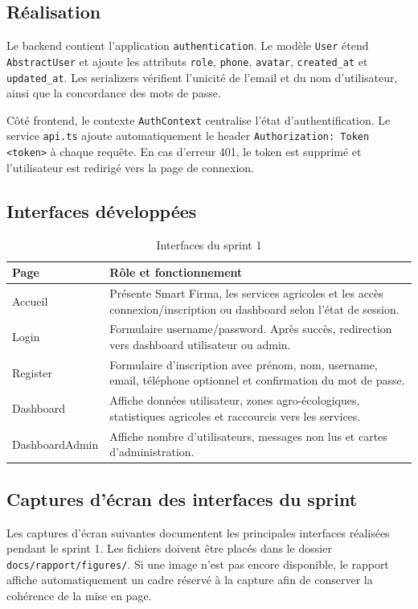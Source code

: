 \subsection{Réalisation}
Le backend contient l'application \texttt{authentication}. Le modèle \texttt{User} étend \texttt{AbstractUser} et ajoute les attributs \texttt{role}, \texttt{phone}, \texttt{avatar}, \texttt{created\_at} et \texttt{updated\_at}. Les serializers vérifient l'unicité de l'email et du nom d'utilisateur, ainsi que la concordance des mots de passe.

Côté frontend, le contexte \texttt{AuthContext} centralise l'état d'authentification. Le service \texttt{api.ts} ajoute automatiquement le header \texttt{Authorization: Token <token>} à chaque requête. En cas d'erreur 401, le token est supprimé et l'utilisateur est redirigé vers la page de connexion.

\subsection{Interfaces développées}
\begin{longtable}{p{3cm}p{11cm}}
\caption{Interfaces du sprint 1}\\
\toprule
\textbf{Page} & \textbf{Rôle et fonctionnement} \\
\midrule
Accueil & Présente Smart Firma, les services agricoles et les accès connexion/inscription ou dashboard selon l'état de session. \\
Login & Formulaire username/password. Après succès, redirection vers dashboard utilisateur ou admin. \\
Register & Formulaire d'inscription avec prénom, nom, username, email, téléphone optionnel et confirmation du mot de passe. \\
Dashboard & Affiche données utilisateur, zones agro-écologiques, statistiques agricoles et raccourcis vers les services. \\
DashboardAdmin & Affiche nombre d'utilisateurs, messages non lus et cartes d'administration. \\
\bottomrule
\end{longtable}

\subsection{Captures d'écran des interfaces du sprint}
Les captures d'écran suivantes documentent les principales interfaces réalisées pendant le sprint 1. Les fichiers doivent être placés dans le dossier \texttt{docs/rapport/figures/}. Si une image n'est pas encore disponible, le rapport affiche automatiquement un cadre réservé à la capture afin de conserver la cohérence de la mise en page.

